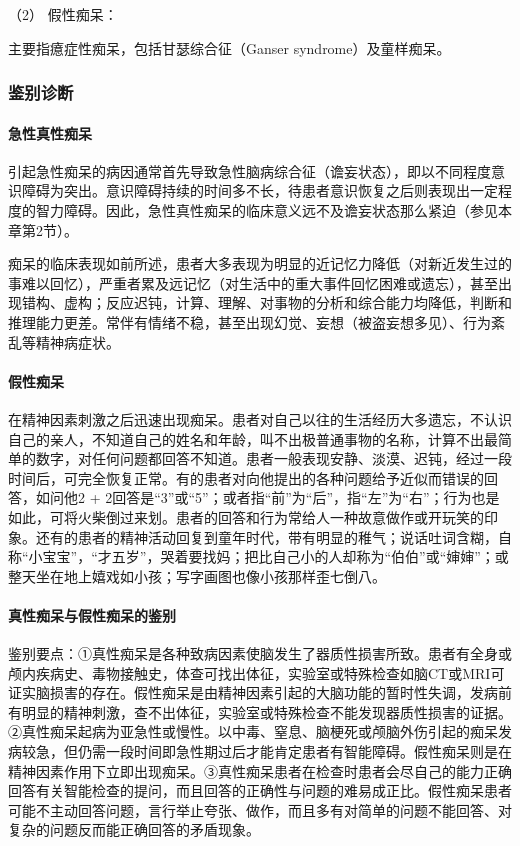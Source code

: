 \hypertarget{text00050.htmlux5cux23CHP1-18-8-1-2-2}{}
（2） 假性痴呆：

主要指癔症性痴呆，包括甘瑟综合征（Ganser syndrome）及童样痴呆。

\subsubsection{鉴别诊断}

\paragraph{急性真性痴呆}

引起急性痴呆的病因通常首先导致急性脑病综合征（谵妄状态），即以不同程度意识障碍为突出。意识障碍持续的时间多不长，待患者意识恢复之后则表现出一定程度的智力障碍。因此，急性真性痴呆的临床意义远不及谵妄状态那么紧迫（参见本章第2节）。

痴呆的临床表现如前所述，患者大多表现为明显的近记忆力降低（对新近发生过的事难以回忆），严重者累及远记忆（对生活中的重大事件回忆困难或遗忘），甚至出现错构、虚构；反应迟钝，计算、理解、对事物的分析和综合能力均降低，判断和推理能力更差。常伴有情绪不稳，甚至出现幻觉、妄想（被盗妄想多见）、行为紊乱等精神病症状。

\paragraph{假性痴呆}

在精神因素刺激之后迅速出现痴呆。患者对自己以往的生活经历大多遗忘，不认识自己的亲人，不知道自己的姓名和年龄，叫不出极普通事物的名称，计算不出最简单的数字，对任何问题都回答不知道。患者一般表现安静、淡漠、迟钝，经过一段时间后，可完全恢复正常。有的患者对向他提出的各种问题给予近似而错误的回答，如问他2
+
2回答是“3”或“5”；或者指“前”为“后”，指“左”为“右”；行为也是如此，可将火柴倒过来划。患者的回答和行为常给人一种故意做作或开玩笑的印象。还有的患者的精神活动回复到童年时代，带有明显的稚气；说话吐词含糊，自称“小宝宝”，“才五岁”，哭着要找妈；把比自己小的人却称为“伯伯”或“婶婶”；或整天坐在地上嬉戏如小孩；写字画图也像小孩那样歪七倒八。

\paragraph{真性痴呆与假性痴呆的鉴别}

鉴别要点：①真性痴呆是各种致病因素使脑发生了器质性损害所致。患者有全身或颅内疾病史、毒物接触史，体查可找出体征，实验室或特殊检查如脑CT或MRI可证实脑损害的存在。假性痴呆是由精神因素引起的大脑功能的暂时性失调，发病前有明显的精神刺激，查不出体征，实验室或特殊检查不能发现器质性损害的证据。②真性痴呆起病为亚急性或慢性。以中毒、窒息、脑梗死或颅脑外伤引起的痴呆发病较急，但仍需一段时间即急性期过后才能肯定患者有智能障碍。假性痴呆则是在精神因素作用下立即出现痴呆。③真性痴呆患者在检查时患者会尽自己的能力正确回答有关智能检查的提问，而且回答的正确性与问题的难易成正比。假性痴呆患者可能不主动回答问题，言行举止夸张、做作，而且多有对简单的问题不能回答、对复杂的问题反而能正确回答的矛盾现象。

